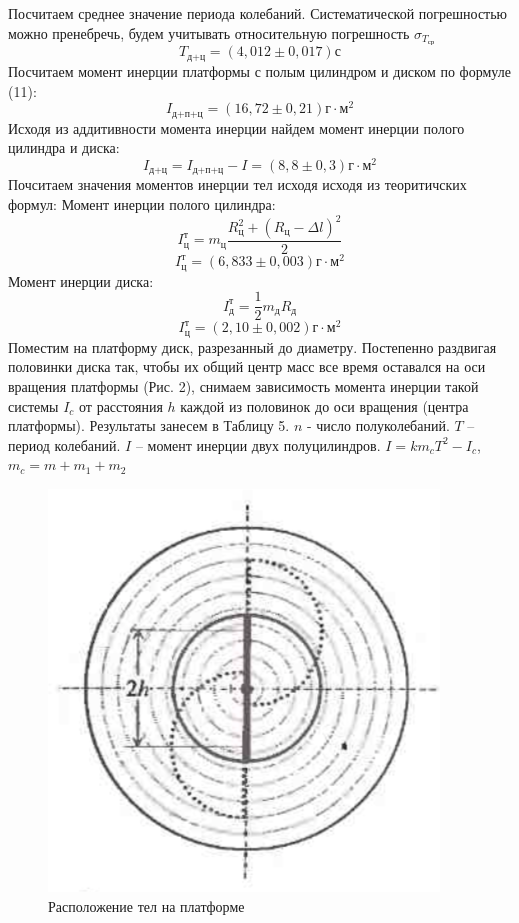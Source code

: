 \documentclass[a4paper,12pt]{article} %
\begin{document}
Посчитаем среднее значение периода колебаний. Систематической погрешностью можно пренебречь, будем учитывать относительную погрешность $\sigma_{T_\text{ср}}$
\[T_\text{д+ц} = (4,012\pm0,017)\text{с}\]
Посчитаем момент инерции платформы с полым цилиндром и диском по формуле (11):
\[I_\text{д+п+ц} = (16,72\pm 0,21)\text{г}\cdot \text{м}^2\]
Исходя из аддитивности момента инерции найдем момент инерции полого цилиндра и диска:
\[I_\text{д+ц} = I_\text{д+п+ц} - I = (8,8\pm 0,3)\text{г}\cdot \text{м}^2\]
Почситаем значения моментов инерции тел исходя исходя из теоритичских формул:
Момент инерции полого цилиндра:
\[I_\text{ц}^\text{т} = m_\text{ц}\frac{R_\text{ц}^2+(R_\text{ц}-\Delta l)^2}{2}\]
\[I_\text{ц}^\text{т} = (6,833\pm0,003)\text{г}\cdot \text{м}^2\]
Момент инерции диска:
\[I_\text{д}^\text{т} = \frac{1}{2}m_\text{д}R_\text{д}\]
\[I_\text{ц}^\text{т} = (2,10\pm0,002)\text{г}\cdot \text{м}^2\]
Поместим на платформу диск, разрезанный до диаметру. Постепенно раздвигая половинки диска так, чтобы их общий центр масс все время оставался на оси вращения платформы (Рис. 2), снимаем зависимость момента инерции такой системы $I_c$ от расстояния $h$ каждой из половинок до оси вращения (центра платформы). Результаты занесем в Таблицу 5. $n$ - число полуколебаний. $T$ -- период колебаний. $I$ -- момент инерции двух полуцилиндров. $I = km_c T^2 - I_c$, $m_c = m+m_1+m_2$
\begin{figure}[h]
\centering
\includegraphics[scale=0.5]{2}
\caption{Расположение тел на платформе}
\end{figure}
\newpage
\end{document}
